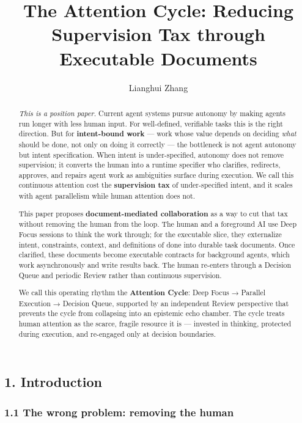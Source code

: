 \documentclass[
  nonatbib,
  preprint]{article}
\title{The Attention Cycle: Reducing Supervision Tax through Executable
Documents}
\author{Lianghui Zhang}
\date{}
\begin{document}
\maketitle
\begin{abstract}
\emph{This is a position paper.} Current agent systems pursue autonomy
by making agents run longer with less human input. For well-defined,
verifiable tasks this is the right direction. But for
\textbf{intent-bound work} --- work whose value depends on deciding
\emph{what} should be done, not only on doing it correctly --- the
bottleneck is not agent autonomy but intent specification. When intent
is under-specified, autonomy does not remove supervision; it converts
the human into a runtime specifier who clarifies, redirects, approves,
and repairs agent work as ambiguities surface during execution. We call
this continuous attention cost the \textbf{supervision tax} of
under-specified intent, and it scales with agent parallelism while human
attention does not.

This paper proposes \textbf{document-mediated collaboration} as a way to
cut that tax without removing the human from the loop. The human and a
foreground AI use Deep Focus sessions to think the work through; for the
executable slice, they externalize intent, constraints, context, and
definitions of done into durable task documents. Once clarified, these
documents become executable contracts for background agents, which work
asynchronously and write results back. The human re-enters through a
Decision Queue and periodic Review rather than continuous supervision.

We call this operating rhythm the \textbf{Attention Cycle}: Deep Focus →
Parallel Execution → Decision Queue, supported by an independent Review
perspective that prevents the cycle from collapsing into an epistemic
echo chamber. The cycle treats human attention as the scarce, fragile
resource it is --- invested in thinking, protected during execution, and
re-engaged only at decision boundaries.
\end{abstract}


\subsection{1. Introduction}\label{introduction}

\subsubsection{1.1 The wrong problem: removing the
human}\label{the-wrong-problem-removing-the-human}
\end{document}
